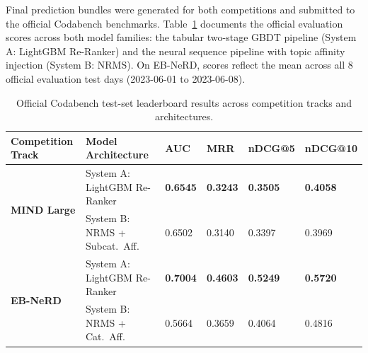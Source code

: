 \documentclass[11pt,a4paper]{article}
\begin{document}
Final prediction bundles were generated for both competitions and submitted to the official Codabench benchmarks. Table~\ref{tab:codabench} documents the official evaluation scores across both model families: the tabular two-stage GBDT pipeline (System A: LightGBM Re-Ranker) and the neural sequence pipeline with topic affinity injection (System B: NRMS). On EB-NeRD, scores reflect the mean across all 8 official evaluation test days (2023-06-01 to 2023-06-08).



\begin{table}[h!]
  \centering
  \caption{Official Codabench test-set leaderboard results across competition tracks and architectures.}
  \label{tab:codabench}
  \vspace{-2pt}
  \small\setlength{\tabcolsep}{5pt}
  \begin{tabularx}{\linewidth}{l l X X X X}
    \toprule
    \textbf{Competition Track} & \textbf{Model Architecture} & \textbf{AUC} & \textbf{MRR} & \textbf{nDCG@5} & \textbf{nDCG@10} \\
    \midrule
    \multirow{2}{*}{\textbf{MIND Large}}
      & System A: LightGBM Re-Ranker   & \textbf{0.6545} & \textbf{0.3243} & \textbf{0.3505} & \textbf{0.4058} \\
      & System B: NRMS + Subcat.\ Aff.  & 0.6502 & 0.3140 & 0.3397 & 0.3969 \\
    \midrule
    \multirow{2}{*}{\textbf{EB-NeRD}}
      & System A: LightGBM Re-Ranker   & \textbf{0.7004} & \textbf{0.4603} & \textbf{0.5249} & \textbf{0.5720} \\
      & System B: NRMS + Cat.\ Aff.     & 0.5664 & 0.3659 & 0.4064 & 0.4816 \\
    \bottomrule
  \end{tabularx}
\end{table}
\end{document}
